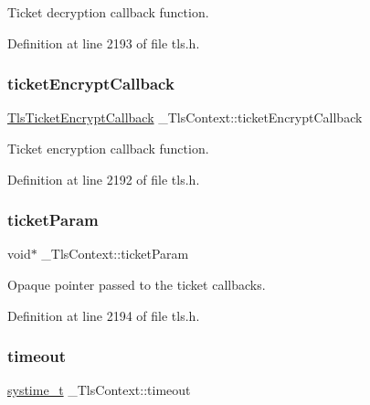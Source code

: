 Ticket decryption callback function. 



Definition at line 2193 of file tls.\+h.

\mbox{\label{struct__TlsContext_aa2e3615e54b33683f6d151ec3da359cf}} 
\subsubsection{\texorpdfstring{ticket\+Encrypt\+Callback}{ticketEncryptCallback}}
{\footnotesize\ttfamily \hyperlink{tls_8h_a285a972f2c50b94aad3c1315595538ed}{Tls\+Ticket\+Encrypt\+Callback} \+\_\+\+Tls\+Context\+::ticket\+Encrypt\+Callback}



Ticket encryption callback function. 



Definition at line 2192 of file tls.\+h.

\mbox{\label{struct__TlsContext_aea986fb507196f9c23b84cbcd096c1bd}} 
\subsubsection{\texorpdfstring{ticket\+Param}{ticketParam}}
{\footnotesize\ttfamily void$\ast$ \+\_\+\+Tls\+Context\+::ticket\+Param}



Opaque pointer passed to the ticket callbacks. 



Definition at line 2194 of file tls.\+h.

\mbox{\label{struct__TlsContext_a1a8c648700a280a6b692bb4d03277456}} 
\subsubsection{\texorpdfstring{timeout}{timeout}}
{\footnotesize\ttfamily \hyperlink{compiler__port_8h_ae3e32a98d431a02106616da3071832dd}{systime\+\_\+t} \+\_\+\+Tls\+Context\+::timeout}



